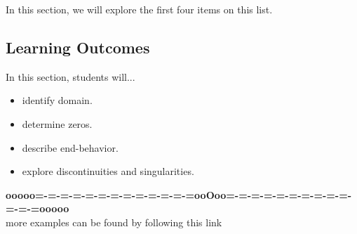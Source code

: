 \documentclass{ximera}
\begin{document}
In this section, we will explore the first four items on this list.









\subsection{Learning Outcomes}

\begin{sectionOutcomes}
In this section, students will...

\begin{itemize}
\item identify domain.
\item determine zeros.
\item describe end-behavior.
\item explore discontinuities and singularities.
\end{itemize}
\end{sectionOutcomes}





















\begin{center}
\textbf{\textcolor{green!50!black}{ooooo=-=-=-=-=-=-=-=-=-=-=-=-=ooOoo=-=-=-=-=-=-=-=-=-=-=-=-=ooooo}} \\

more examples can be found by following this link\\ 

\end{center}
\end{document}
